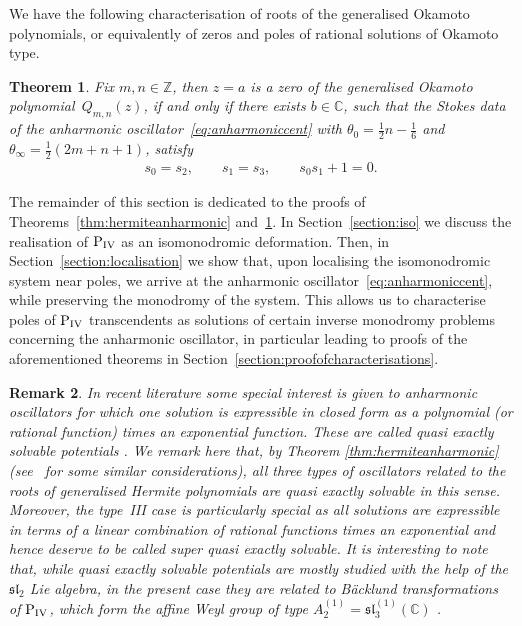 \documentclass[pdftex]{sigma}
\numberwithin{equation}{section}
\newtheorem{thm}{Theorem}[section]
\newtheorem{rem*}[thm]{Remark}
\newcommand{\bb}[1]{\mathbb{ #1 }}
\begin{document}
We have the following characterisation of roots of the generalised Okamoto polynomials, or equivalently of zeros and poles of rational solutions of Okamoto type.
\begin{thm}\label{thm:okamotoanharmonic}
		Fix $m,n\in\mathbb{Z}$, then $z=a$ is a zero of the generalised Okamoto polyno\-mial~$Q_{m,n}(z)$, if and only if
there exists $b\in\mathbb{C}$, such that the Stokes data of the anharmonic oscillator~\eqref{eq:anharmoniccent} with $\theta_0=\tfrac{1}{2}n-\tfrac{1}{6}$ and $\theta_\infty=\tfrac{1}{2}(2m+n+1)$, satisfy
			\begin{gather*}
			s_0=s_2,\qquad s_1=s_3,\qquad s_0s_1+1=0.
			\end{gather*}
\end{thm}

The remainder of this section is dedicated to the proofs of Theorems~\ref{thm:hermiteanharmonic} and~\ref{thm:okamotoanharmonic}. In Section~\ref{section:iso} we discuss the realisation of ${\rm P}_{\rm IV}$ as an isomonodromic deformation. Then, in Section~\ref{section:localisation} we show that, upon localising the isomonodromic system near poles, we arrive at the anharmonic oscillator~\eqref{eq:anharmoniccent}, while preserving the monodromy of the system. This allows us to characterise poles of ${\rm P}_{\rm IV}$ transcendents as solutions of certain inverse monodromy problems concerning the anharmonic oscillator,
in particular leading to proofs of the aforementioned theorems in Section~\ref{section:proofofcharacterisations}.

\begin{rem*} In recent literature some special interest is given to anharmonic oscillators for which one solution is expressible in closed form as a polynomial (or rational function) times an exponential function. These are called quasi exactly solvable potentials \cite{bender98quasi,turbiner2016}. We remark here that, by Theorem \ref{thm:hermiteanharmonic} (see~\cite{marquettequesne2016} for some similar considerations), all three types of oscillators related to the roots of generalised Hermite polynomials are quasi exactly solvable in this sense. Moreover, the type~III case is particularly special as all solutions are expressible in terms of a linear combination of rational functions times an exponential and hence deserve to be called super quasi exactly solvable. It is interesting to note that, while quasi exactly solvable potentials are mostly studied with the help of the ${\mathfrak{sl}}_2$ Lie algebra, in the present case they are related to B\"acklund transformations of ${\rm P}_{\rm IV}$, which form the af\/f\/ine Weyl group of type $A_2^{(1)}={\mathfrak{sl}}_3^{(1)}(\bb{C})$ \cite{noumi}.
\end{rem*}
		
\end{document}
